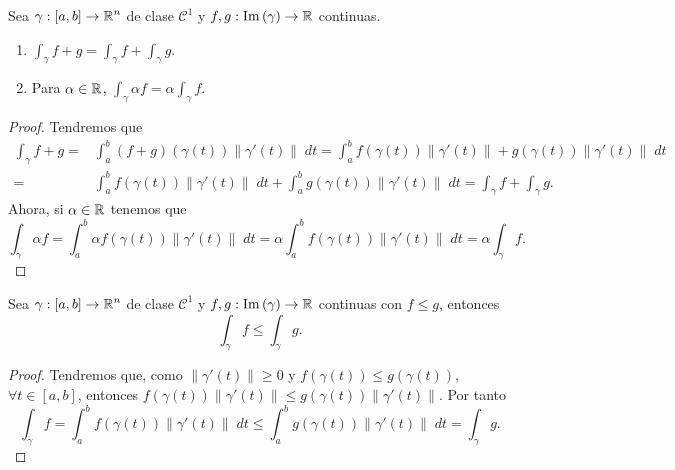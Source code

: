 \begin{prop}[Linealidad] Sea $\displaystyle \gamma : \left[a,b\right] \to \mathbb{R}^{n} $ de clase $\displaystyle \mathcal{C}^{1} $ y $\displaystyle f,g : \operatorname{Im}\left(\gamma \right)\to \mathbb{R} $ continuas.
	\begin{enumerate}
	\item $\displaystyle \int _{\gamma }f + g = \int _{\gamma }f+ \int _{\gamma }g $.
	\item Para $\displaystyle \alpha \in \mathbb{R} $, $\displaystyle \int _{\gamma }\alpha f = \alpha \int _{\gamma }f $.
	\end{enumerate}
\end{prop}
\begin{proof}
Tendremos que 
\[
\begin{split}
	\int _{\gamma }f+ g = & \int _{a}^{b}\left(f+g\right)\left(\gamma\left(t\right)\right)\|\gamma'\left(t\right)\| \; dt = \int^{b}_{a} f\left(\gamma\left(t\right)\right)\|\gamma'\left(t\right)\| + g\left(\gamma\left(t\right)\right)\|\gamma'\left(t\right)\| \; dt \\
	= & \int^{b}_{a} f\left(\gamma\left(t\right)\right)\|\gamma'\left(t\right)\| \; dt + \int^{b}_{a} g\left(\gamma\left(t\right)\right)\|\gamma'\left(t\right)\| \; dt = \int _{\gamma }f + \int _{\gamma }g  .
\end{split}
\]
Ahora, si $\displaystyle \alpha \in \mathbb{R} $ tenemos que 
\[\int _{\gamma }\alpha f = \int^{b}_{a} \alpha f\left(\gamma \left(t\right)\right)\|\gamma'\left(t\right)\| \; dt = \alpha \int^{b}_{a} f\left(\gamma\left(t\right)\right)\|\gamma'\left(t\right)\| \; dt =\alpha \int _{\gamma }f.\]
\end{proof}

\begin{prop}[Monotonía]
	Sea $\displaystyle \gamma : \left[a,b\right] \to \mathbb{R}^{n} $ de clase $\displaystyle \mathcal{C}^{1} $ y $\displaystyle f,g : \operatorname{Im}\left(\gamma \right)\to \mathbb{R} $ continuas con $\displaystyle f \leq g $, entonces 
	\[\int _{\gamma }f \leq \int _{\gamma }g .\]
\end{prop}
\begin{proof}
	Tendremos que, como $\displaystyle \|\gamma'\left(t\right)\| \geq 0 $ y $\displaystyle f\left(\gamma\left(t\right)\right) \leq g\left(\gamma \left(t\right)\right) $, $\displaystyle \forall t \in \left[a,b\right]  $, entonces $\displaystyle f\left(\gamma\left(t\right)\right)\|\gamma'\left(t\right)\| \leq g\left(\gamma\left(t\right)\right)\|\gamma'\left(t\right)\| $. Por tanto
\[\int _{\gamma }f = \int^{b}_{a} f\left(\gamma\left(t\right)\right)\|\gamma'\left(t\right)\| \; dt\leq \int^{b}_{a} g\left(\gamma\left(t\right)\right)\|\gamma'\left(t\right)\| \; dt = \int _{\gamma }g  .\]
\end{proof}

